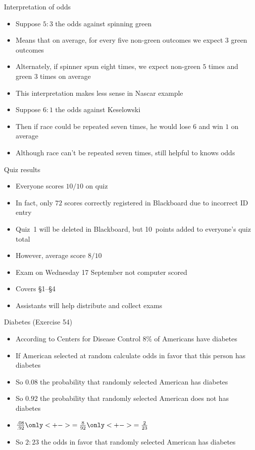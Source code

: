 \documentclass[handout]{beamer}
\theoremstyle{definition}
\begin{document}
\begin{frame}{Interpretation of odds} 
\begin{itemize}
\item Suppose $5:3$ the odds against spinning green
\item Means that on average, for every five non-green outcomes
we expect $3$ green outcomes
\item Alternately, if spinner spun eight times, we expect
non-green $5$ times and green $3$ times on average
\item This interpretation makes less sense in Nascar example
\item Suppose $6:1$ the odds against Keselowski
\item Then if race could be repeated seven times, he would
lose $6$ and win $1$ on average
\item Although race can't be repeated seven times,
still helpful to knows odds
\end{itemize}
\end{frame}

\begin{frame}{Quiz results}
\begin{itemize}
\item Everyone scores $10/10$ on quiz
\item In fact, only $72$ scores correctly registered in Blackboard
due to incorrect ID entry
\item Quiz~1 will be deleted in Blackboard, but 10~points
added to everyone's quiz total
\item However, average score $8/10$
\item Exam on \alert{Wednesday 17 September} not computer scored
\item Covers \S1--\S4
\item Assistants will help distribute and collect exams
\end{itemize}
\end{frame}

\begin{frame}{Diabetes (Exercise 54)}
\begin{itemize}
\item According to Centers for Disease Control
$8\%$ of Americans have diabetes
\item If American selected at random
calculate odds in favor that this person has diabetes
\item So $0.08$ the probability that randomly selected
American has diabetes
\item So $0.92$ the probability that randomly selected
American \alert{does not} has diabetes
\item $\frac{.08}{.92}
\only<+->{=\frac{8}{92}}
\only<+->{=\frac{2}{23}}$
\item So $2:23$ the odds in favor that randomly
selected American has diabetes
\end{itemize}
\end{frame}
\end{document}
